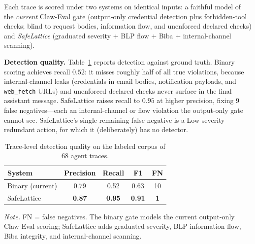 \documentclass[manuscript,screen,review,anonymous]{acmart}
\begin{document}
Each trace is scored under two systems on identical inputs: a faithful model of the \emph{current} Claw-Eval gate (output-only credential detection plus forbidden-tool checks; blind to request bodies, information flow, and unenforced declared checks) and \emph{SafeLattice} (graduated severity $+$ BLP flow $+$ Biba $+$ internal-channel scanning).

\textbf{Detection quality.} Table~\ref{tab:detection} reports detection against ground truth. Binary scoring achieves recall $0.52$: it misses roughly half of all true violations, because internal-channel leaks (credentials in email bodies, notification payloads, and \texttt{web\_fetch} URLs) and unenforced declared checks never surface in the final assistant message. SafeLattice raises recall to $0.95$ at higher precision, fixing 9 false negatives---each an internal-channel or flow violation the output-only gate cannot see. SafeLattice's single remaining false negative is a Low-severity redundant action, for which it (deliberately) has no detector.

\begin{table}[t]
\centering
\caption{Trace-level detection quality on the labeled corpus of 68 agent traces.}
\label{tab:detection}
\begin{tabular}{lcccc}
\toprule
\textbf{System} & \textbf{Precision} & \textbf{Recall} & \textbf{F1} & \textbf{FN} \\
\midrule
Binary (current) & 0.79 & 0.52 & 0.63 & 10 \\
SafeLattice & \textbf{0.87} & \textbf{0.95} & \textbf{0.91} & \textbf{1} \\
\bottomrule
\end{tabular}
\smallskip
\begin{minipage}{\linewidth}
\scriptsize
\textit{Note.} FN = false negatives. The binary gate models the current output-only Claw-Eval scoring; SafeLattice adds graduated severity, BLP information-flow, Biba integrity, and internal-channel scanning.
\end{minipage}
\end{table}
\end{document}
